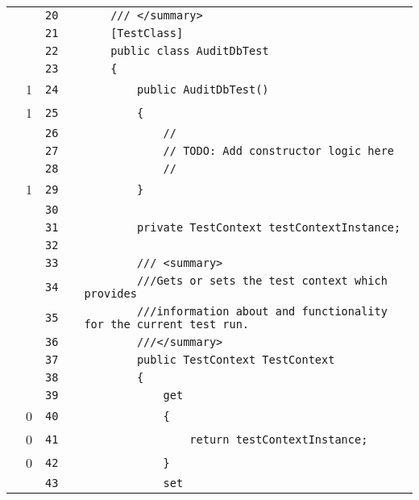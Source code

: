 \documentclass[a4paper,10pt]{article}
\begin{document}
\begin{longtable}[l]{lrrll}
\cellcolor{gray} &  & \verb~20~ & & \verb~    /// </summary>~\\
\cellcolor{gray} &  & \verb~21~ & & \verb~    [TestClass]~\\
\cellcolor{gray} &  & \verb~22~ & & \verb~    public class AuditDbTest~\\
\cellcolor{gray} &  & \verb~23~ & & \verb~    {~\\
\cellcolor{green} & 1 & \verb~24~ & & \verb~        public AuditDbTest()~\\
\cellcolor{green} & 1 & \verb~25~ & & \verb~        {~\\
\cellcolor{gray} &  & \verb~26~ & & \verb~            //~\\
\cellcolor{gray} &  & \verb~27~ & & \verb~            // TODO: Add constructor logic here~\\
\cellcolor{gray} &  & \verb~28~ & & \verb~            //~\\
\cellcolor{green} & 1 & \verb~29~ & & \verb~        }~\\
\cellcolor{gray} &  & \verb~30~ & & \verb~~\\
\cellcolor{gray} &  & \verb~31~ & & \verb~        private TestContext testContextInstance;~\\
\cellcolor{gray} &  & \verb~32~ & & \verb~~\\
\cellcolor{gray} &  & \verb~33~ & & \verb~        /// <summary>~\\
\cellcolor{gray} &  & \verb~34~ & & \verb~        ///Gets or sets the test context which provides~\\
\cellcolor{gray} &  & \verb~35~ & & \verb~        ///information about and functionality for the current test run.~\\
\cellcolor{gray} &  & \verb~36~ & & \verb~        ///</summary>~\\
\cellcolor{gray} &  & \verb~37~ & & \verb~        public TestContext TestContext~\\
\cellcolor{gray} &  & \verb~38~ & & \verb~        {~\\
\cellcolor{gray} &  & \verb~39~ & & \verb~            get~\\
\cellcolor{red} & 0 & \verb~40~ & & \verb~            {~\\
\cellcolor{red} & 0 & \verb~41~ & & \verb~                return testContextInstance;~\\
\cellcolor{red} & 0 & \verb~42~ & & \verb~            }~\\
\cellcolor{gray} &  & \verb~43~ & & \verb~            set~\\

\end{longtable}
\end{document}
